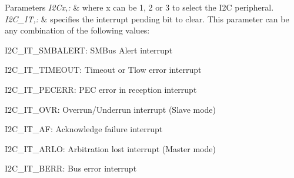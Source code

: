 \begin{DoxyParams}{Parameters}
{\em I2\-Cx,\-:} & where x can be 1, 2 or 3 to select the I2\-C peripheral. \\
\hline
{\em I2\-C\-\_\-\-I\-T,\-:} & specifies the interrupt pending bit to clear. This parameter can be any combination of the following values\-: \begin{DoxyItemize}
\item I2\-C\-\_\-\-I\-T\-\_\-\-S\-M\-B\-A\-L\-E\-R\-T\-: S\-M\-Bus Alert interrupt \item I2\-C\-\_\-\-I\-T\-\_\-\-T\-I\-M\-E\-O\-U\-T\-: Timeout or Tlow error interrupt \item I2\-C\-\_\-\-I\-T\-\_\-\-P\-E\-C\-E\-R\-R\-: P\-E\-C error in reception interrupt \item I2\-C\-\_\-\-I\-T\-\_\-\-O\-V\-R\-: Overrun/\-Underrun interrupt (Slave mode) \item I2\-C\-\_\-\-I\-T\-\_\-\-A\-F\-: Acknowledge failure interrupt \item I2\-C\-\_\-\-I\-T\-\_\-\-A\-R\-L\-O\-: Arbitration lost interrupt (Master mode) \item I2\-C\-\_\-\-I\-T\-\_\-\-B\-E\-R\-R\-: Bus error interrupt\end{DoxyItemize}
\\
\hline
\end{DoxyParams}
